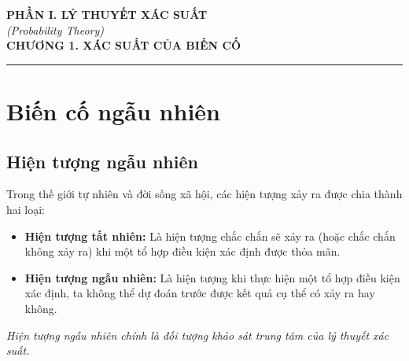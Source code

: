 \begin{center}
    {\large \textbf{PHẦN I. LÝ THUYẾT XÁC SUẤT}}\\[0.3em]
    {\normalsize \textit{(Probability Theory)}}\\[1em]
    {\LARGE \textbf{CHƯƠNG 1. XÁC SUẤT CỦA BIẾN CỐ}}
\end{center}

\vspace{1em}
\hrule
\vspace{1.5em}

\section{Biến cố ngẫu nhiên}

\subsection{Hiện tượng ngẫu nhiên}
Trong thế giới tự nhiên và đời sống xã hội, các hiện tượng xảy ra được chia thành hai loại:
\begin{itemize}[leftmargin=1.5em]
    \item \textbf{Hiện tượng tất nhiên:} Là hiện tượng chắc chắn sẽ xảy ra (hoặc chắc chắn không xảy ra) khi một tổ hợp điều kiện xác định được thỏa mãn.
    \item \textbf{Hiện tượng ngẫu nhiên:} Là hiện tượng khi thực hiện một tổ hợp điều kiện xác định, ta không thể dự đoán trước được kết quả cụ thể có xảy ra hay không.
\end{itemize}
\textit{Hiện tượng ngẫu nhiên chính là đối tượng khảo sát trung tâm của lý thuyết xác suất.}

